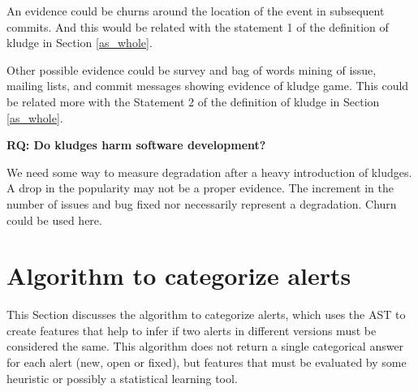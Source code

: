 \documentclass[
]{article}
\begin{document}
An evidence could be churns around the location of the event in
subsequent commits. And this would be related with the statement 1 of
the definition of kludge in Section \ref{as_whole}.

Other possible evidence could be survey and bag of words mining of
issue, mailing lists, and commit messages showing evidence of kludge
game. This could be related more with the Statement 2 of the definition
of kludge in Section \ref{as_whole}.

\vspace{16px}
\noindent
\textbf{RQ: Do kludges harm software development?} \label{kludge_harm}

We need some way to measure degradation after a heavy introduction of
kludges. A drop in the popularity may not be a proper evidence. The
increment in the number of issues and bug fixed nor necessarily
represent a degradation. Churn could be used here.


\section{Algorithm to categorize alerts}\label{alg}

This Section discusses the algorithm to categorize alerts, which uses
the AST to create features that help to infer if two alerts in different
versions must be considered the same. This algorithm does not return a
single categorical answer for each alert (new, open or fixed), but
features that must be evaluated by some heuristic or possibly a
statistical learning tool.



\end{document}

